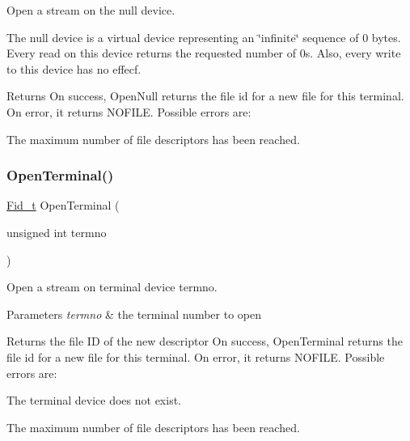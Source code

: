 Open a stream on the null device. 

The null device is a virtual device representing an \char`\"{}infinite\char`\"{} sequence of 0 bytes. Every read on this device returns the requested number of 0s. Also, every write to this device has no effecf.

\begin{DoxyReturn}{Returns}
On success, Open\+Null returns the file id for a new file for this terminal. On error, it returns N\+O\+F\+I\+LE. Possible errors are\+:
\begin{DoxyItemize}
\item The maximum number of file descriptors has been reached. 
\end{DoxyItemize}
\end{DoxyReturn}
\mbox{\label{group__syscalls_ga6ea2b586a8dfcfc1e7065e1664a0fb35}} 
\subsubsection{\texorpdfstring{Open\+Terminal()}{OpenTerminal()}}
{\footnotesize\ttfamily \hyperlink{group__syscalls_ga5097222c5f0da97d92d4712359abc38f}{Fid\+\_\+t} Open\+Terminal (\begin{DoxyParamCaption}\item[{unsigned int}]{termno }\end{DoxyParamCaption})}



Open a stream on terminal device \textquotesingle{}termno\textquotesingle{}. 


\begin{DoxyParams}{Parameters}
{\em termno} & the terminal number to open \\
\hline
\end{DoxyParams}
\begin{DoxyReturn}{Returns}
the file ID of the new descriptor On success, Open\+Terminal returns the file id for a new file for this terminal. On error, it returns {\ttfamily N\+O\+F\+I\+LE}. Possible errors are\+:
\begin{DoxyItemize}
\item The terminal device does not exist.
\item The maximum number of file descriptors has been reached. 
\end{DoxyItemize}
\end{DoxyReturn}
\mbox{\label{group__syscalls_gab6355ce54e047c31538ed5ed9108b5b3}} 
